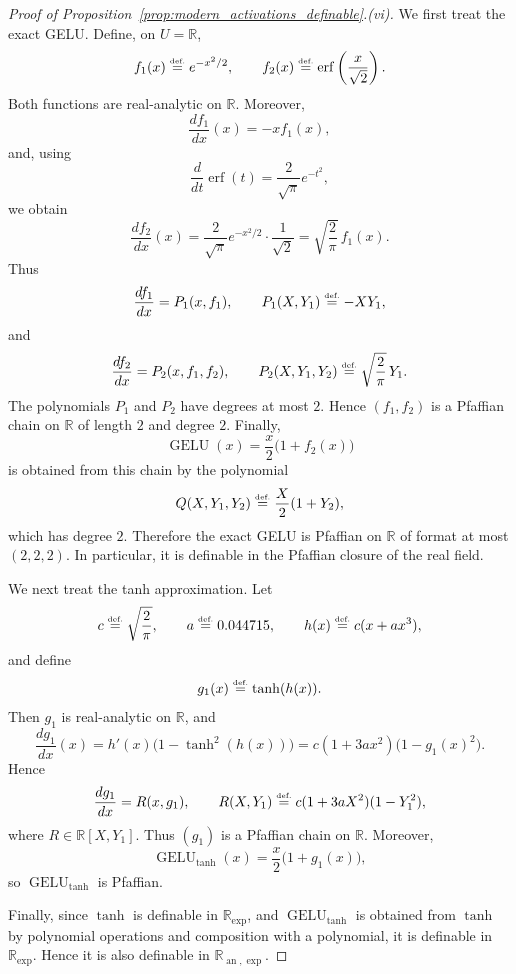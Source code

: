\documentclass{article}
\newcommand{\eqdef}{\ensuremath{\stackrel{\mbox{\upshape\tiny def.}}{=}}}
\theoremstyle{plain}
\theoremstyle{definition}
\theoremstyle{remark}
\theoremstyle{plain}
\numberwithin{thm}{section}
\theoremstyle{definition}
\numberwithin{equation}{section}
\begin{document}
\begin{proof}[{Proof of Proposition~\ref{prop:modern_activations_definable}.(vi)}]
We first treat the exact GELU. Define, on \(U=\mathbb{R}\),
\[
    f_1(x)\eqdef e^{-x^2/2},
    \qquad
    f_2(x)\eqdef \operatorname{erf}\left(\frac{x}{\sqrt{2}}\right).
\]
Both functions are real-analytic on \(\mathbb{R}\). Moreover,
\[
    \frac{d f_1}{dx}(x)
    =
    -x f_1(x),
\]
and, using
\[
    \frac{d}{dt}\operatorname{erf}(t)
    =
    \frac{2}{\sqrt{\pi}}e^{-t^2},
\]
we obtain
\[
    \frac{d f_2}{dx}(x)
    =
    \frac{2}{\sqrt{\pi}}
    e^{-x^2/2}
    \cdot
    \frac{1}{\sqrt{2}}
    =
    \sqrt{\frac{2}{\pi}}\,f_1(x).
\]
Thus
\[
    \frac{d f_1}{dx}
    =
    P_1(x,f_1),
    \qquad
    P_1(X,Y_1)\eqdef -XY_1,
\]
and
\[
    \frac{d f_2}{dx}
    =
    P_2(x,f_1,f_2),
    \qquad
    P_2(X,Y_1,Y_2)\eqdef \sqrt{\frac{2}{\pi}}\,Y_1.
\]
The polynomials \(P_1\) and \(P_2\) have degrees at most \(2\). Hence
\((f_1,f_2)\) is a Pfaffian chain on \(\mathbb{R}\) of length \(2\) and degree
\(2\). Finally,
\[
    \operatorname{GELU}(x)
    =
    \frac{x}{2}\bigl(1+f_2(x)\bigr)
\]
is obtained from this chain by the polynomial
\[
    Q(X,Y_1,Y_2)\eqdef \frac{X}{2}(1+Y_2),
\]
which has degree \(2\). Therefore the exact GELU is Pfaffian on
\(\mathbb{R}\) of format at most \((2,2,2)\). In particular, it is definable in
the Pfaffian closure of the real field.

We next treat the tanh approximation. Let
\[
    c\eqdef \sqrt{\frac{2}{\pi}},
    \qquad
    a\eqdef 0.044715,
    \qquad
    h(x)\eqdef c(x+ax^3),
\]
and define
\[
    g_1(x)\eqdef \tanh(h(x)).
\]
Then \(g_1\) is real-analytic on \(\mathbb{R}\), and
\[
    \frac{d g_1}{dx}(x)
    =
    h'(x)\bigl(1-\tanh^2(h(x))\bigr)
    =
    c(1+3ax^2)\bigl(1-g_1(x)^2\bigr).
\]
Hence
\[
    \frac{d g_1}{dx}
    =
    R(x,g_1),
    \qquad
    R(X,Y_1)\eqdef c(1+3aX^2)(1-Y_1^2),
\]
where \(R\in\mathbb{R}[X,Y_1]\). Thus \((g_1)\) is a Pfaffian chain on
\(\mathbb{R}\). Moreover,
\[
    \operatorname{GELU}_{\tanh}(x)
    =
    \frac{x}{2}\bigl(1+g_1(x)\bigr),
\]
so \(\operatorname{GELU}_{\tanh}\) is Pfaffian.

Finally, since \(\tanh\) is definable in \(\mathbb{R}_{\exp}\), and
\(\operatorname{GELU}_{\tanh}\) is obtained from \(\tanh\) by polynomial
operations and composition with a polynomial, it is definable in
\(\mathbb{R}_{\exp}\). Hence it is also definable in
\(\mathbb{R}_{\operatorname{an},\exp}\).
\end{proof}
\end{document}
